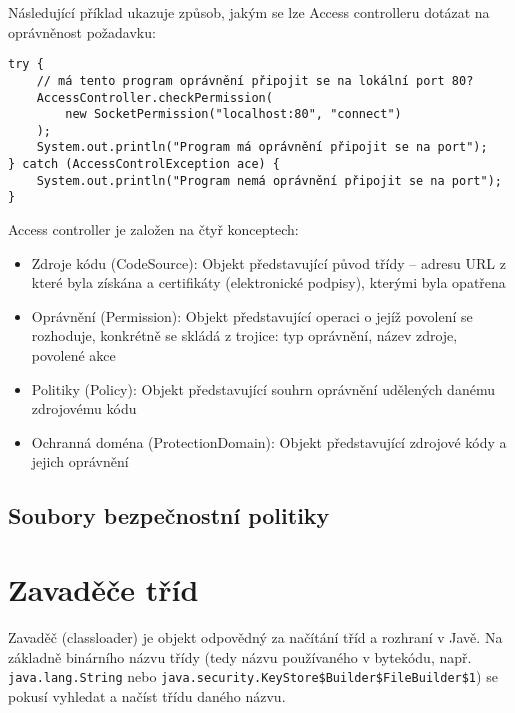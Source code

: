 Následující příklad ukazuje způsob, jakým se lze Access controlleru dotázat na oprávněnost požadavku: \cite[5.5]{oaks}

\begin{verbatim}
try {
    // má tento program oprávnění připojit se na lokální port 80?
    AccessController.checkPermission(
        new SocketPermission("localhost:80", "connect")
    );
    System.out.println("Program má oprávnění připojit se na port");
} catch (AccessControlException ace) {
    System.out.println("Program nemá oprávnění připojit se na port");
}
\end{verbatim}

Access controller je založen na čtyř konceptech: \cite[5]{oaks}

\begin{itemize}
  \item Zdroje kódu (CodeSource): Objekt představující původ třídy -- adresu URL z které byla získána a certifikáty (elektronické podpisy), kterými byla opatřena \cite[5.1]{oaks}
  \item Oprávnění (Permission): Objekt představující operaci o jejíž povolení se rozhoduje, konkrétně se skládá z trojice: typ oprávnění, název zdroje, povolené akce \cite[5.2]{oaks}
  \item Politiky (Policy): Objekt představující souhrn oprávnění udělených danému zdrojovému kódu \cite[5.3]{oaks}
  \item Ochranná doména (ProtectionDomain): Objekt představující zdrojové kódy a jejich oprávnění \cite[5.4]{oaks}
\end{itemize}

\subsection{Soubory bezpečnostní politiky}



\section{Zavaděče tříd}

Zavaděč (classloader) je objekt odpovědný za načítání tříd a rozhraní v Javě. Na základně binárního názvu třídy (tedy názvu používaného v bytekódu, např. {\tt java.lang.String} nebo {\tt java.security.KeyStore\$Builder\$FileBuilder\$1}) se pokusí vyhledat a načíst třídu daného názvu. \cite{refClassLoader}

